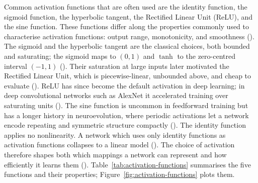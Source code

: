 \documentclass[12pt]{article}
\begin{document}
Common activation functions that are often used are the identity function, the sigmoid function, the hyperbolic tangent, the Rectified Linear Unit (ReLU), and the sine function.
These functions differ along the properties commonly used to characterise activation functions: output range, monotonicity, and smoothness (\cite{dubey_activation_2022}).
The sigmoid and the hyperbolic tangent are the classical choices, both bounded and saturating; the sigmoid maps to $(0,1)$ and $\tanh$ to the zero-centred interval $(-1,1)$ (\cite{dubey_activation_2022}).
Their saturation at large inputs later motivated the Rectified Linear Unit, which is piecewise-linear, unbounded above, and cheap to evaluate (\cite{nair_rectified_2010}).
ReLU has since become the default activation in deep learning; in deep convolutional networks such as AlexNet it accelerated training over saturating units (\cite{krizhevsky_imagenet_2012,ramachandran_searching_2017}).
The sine function is uncommon in feedforward training but has a longer history in neuroevolution, where periodic activations let a network encode repeating and symmetric structure compactly (\cite{stanley_compositional_2007}).
The identity function applies no nonlinearity. A network which uses only identity functions as activation functions collapses to a linear model (\cite{dubey_activation_2022}).
The choice of activation therefore shapes both which mappings a network can represent and how efficiently it learns them (\cite{dubey_activation_2022}).
Table~\ref{tab:activation-functions} summarises the five functions and their properties; Figure~\ref{fig:activation-functions} plots them.
\end{document}

